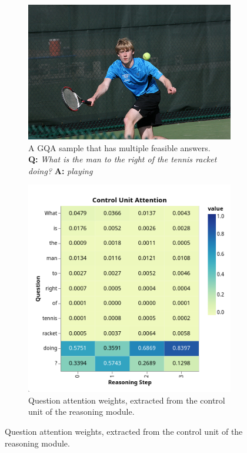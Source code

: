 \begin{figure}[htbp]
    \centering
    \begin{subfigure}[l]{0.5\textwidth}
        \includegraphics[width=\textwidth]{figures/negative_ambiguous/negative_ambiguous.png}
        \caption[A GQA sample that has multiple feasible answers.]{A GQA sample that has multiple feasible answers.\\\textbf{Q:} \textit{What is the man to the right of the tennis racket doing?} \textbf{A:} \textit{playing}}
        \label{fig:negative_ambiguous_sample}
    \end{subfigure}
    \hfill
    \begin{subfigure}[r]{0.4\textwidth}
        \includegraphics[width=\textwidth]{figures/negative_ambiguous/negative_ambiguous_control_attn.png}
        \caption[Question attention weights, extracted from the control unit of the reasoning module.]{Question attention weights, extracted from the control unit of the reasoning module.}
        \label{fig:negative_ambiguous_control_attn}
    \end{subfigure}
\end{figure}

